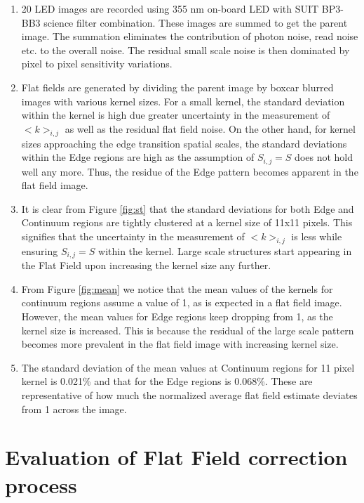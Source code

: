 \documentclass[11pt,a4paper]{article}
\begin{document}
	\begin{enumerate}
		\item 	20 LED images are recorded using 355 nm on-board LED with SUIT BP3-BB3 science filter combination. These images are summed to get the parent image. 		
		The summation eliminates the contribution of photon noise, read noise etc. to the overall noise. The residual small scale noise is then dominated by pixel to pixel sensitivity variations.  
		
		\item  Flat fields are generated by dividing the parent image by boxcar blurred images with various kernel sizes. For a small kernel, the standard deviation within the kernel is high due greater uncertainty in the measurement of $<k>_{i,j}$ as well as the residual flat field noise. On the other hand, for kernel sizes approaching the edge transition spatial scales, the standard deviations within the Edge regions are high as	the assumption of $S_{i,j} = S$  does not hold well any more. Thus, the residue of the Edge pattern becomes apparent in the flat field image.
		
		\item It is clear from Figure \ref{fig:st} that the standard deviations for both Edge and Continuum regions are tightly clustered at a kernel size of 11x11 pixels. This signifies that the uncertainty in the measurement of $<k>_{i,j}$ is less while ensuring $S_{i,j}=S$ within the kernel. Large scale structures start appearing in the Flat Field upon increasing the kernel size any further.
		
		\item From Figure \ref{fig:mean} we notice that the mean values of the kernels for continuum regions assume a value of 1, as is expected in a flat field image. However, the mean values for Edge regions keep dropping from 1, as the kernel size is increased. This is because the residual of the large scale pattern becomes more prevalent in the flat field image with increasing kernel size.
		
		\item The standard deviation of the mean values at Continuum regions  for 11 pixel kernel is 0.021\% and that for the Edge regions is 0.068\%. These are representative of how much the normalized average flat field estimate deviates from 1 across the image.
	\end{enumerate}
		\section{Evaluation of Flat Field correction process}
\end{document}
